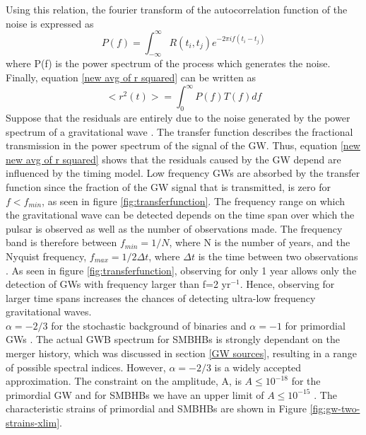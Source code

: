 \documentclass[12pt]{article}
\begin{document}
	Using this relation, the fourier transform of the autocorrelation function of the noise is expressed as
	\begin{equation}
	P(f)=\int_{-\infty}^{\infty}R(t_i,t_j)e^{-2 \pi i f(t_i-t_j)}
	\end{equation}
	where P(f) is the power spectrum of the process which generates the noise. Finally, equation \ref{new avg of r squared} can be written as 
	\begin{equation}\label{new new avg of r squared}
	<r^{2}(t)>=\int_{0}^{\infty}P(f)T(f)df
	\end{equation}
	Suppose that the residuals are entirely due to the noise generated by the power spectrum of a gravitational wave \cite{blandford1976arrival}. The transfer function describes the fractional transmission in the power spectrum of the signal of the GW. Thus, equation \ref{new new avg of r squared} shows that the residuals caused by the GW depend are influenced by the timing model. Low frequency GWs are absorbed by the transfer function since the fraction of the GW signal that is transmitted, is zero for $f<f_{min}$, as seen in figure \ref{fig:transferfunction}. The frequency range on which the gravitational wave can be detected \cite{hobbs2010international} depends on the time span over which the pulsar is observed as well as the number of observations made. The frequency band is therefore between $f_{min}=1/N$, where N is the number of years, and the Nyquist frequency, $f_{max}=1/{2\Delta t}$, where $\Delta t$ is the time between two observations \cite{sesana2010gravitational}. As seen in figure \ref{fig:transferfunction}, observing for only 1 year allows only the detection of GWs with frequency larger than f=2 yr$^{-1}$. Hence, observing for larger time spans increases the chances of detecting ultra-low frequency gravitational waves. \\ 
	
	 $\alpha=-2/3$ for the stochastic background of binaries \cite{moore2014gravitational} and $\alpha=-1$ for primordial GWs \cite{zhao2013constraints}. The actual GWB spectrum for SMBHBs is strongly dependant on the merger history, which was discussed in section \ref{GW sources}, resulting in a range of possible spectral indices. However, $\alpha = −2/3$ is a widely accepted approximation. The constraint on the amplitude, A, is $A \leq 10^{-18}$ \cite{zhao2013constraints} for the primordial GW and for SMBHBs we have an upper limit of $A \leq 10^{-15}$ \cite{arzoumanian2016nanograv}. The characteristic strains of primordial and SMBHBs are shown in Figure \ref{fig:gw-two-strains-xlim}. 
	
\end{document}
